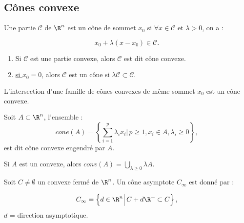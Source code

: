 \documentclass[12pt,a4paper]{article}
\begin{document}
	\subsection{Cônes convexe}
	
	\begin{defi}
		\begin{minipage}[t]{15cm}
			Une partie $\mathcal C$ de $\R^n$ est un cône de sommet $x_0$ si $\forall x \in \mathcal C$ et $\lambda > 0$, on a :
		\end{minipage}
		\[
			x_0 + \lambda(x-x_0) \in \mathcal C.
		\]
	\end{defi}
	
	\begin{rmq}
		\begin{minipage}[t]{15cm}
			\begin{enumerate}[label=$\textbullet$]
				\item  Si $\mathcal C$ est une partie convexe, alors $\mathcal C$ est dit cône convexe.
				
				\item \underline{si $x_0=0$}, alors $\mathcal C$ est un cône si $\lambda\mathcal C \subset \mathcal C$.
			\end{enumerate}
		\end{minipage}
	\end{rmq}
	
	\begin{prop}
		L'intersection d'une famille de cônes convexes de même sommet $x_0$ est un cône convexe.
	\end{prop}
	
	\begin{defi}
		Soit $A \subset \R^n$, l'ensemble :
		\[cone(A) = \left\{\displaystyle\sum_{i=1}^p \lambda_ix_i\Big|\, p \geq 1, x_i \in A, \lambda_i \geq 0\right\},\]
		est dit cône convexe engendré par $A$.
	\end{defi}
	
	\begin{rmq}
		Si $A$ est un convexe, alors $conv(A) = \bigcup_{\lambda\geq 0} \lambda A$.
	\end{rmq}
	
	\begin{defi}
		\begin{minipage}[t]{15cm}
			Soit $C \not= \emptyset$ un convexe fermé de $\R^n$. Un cône asymptote $C_\infty$ est donné par :
		\end{minipage}
		\[
			C_\infty = \left\{d\in \R^n \Big|\, C+d \R^+ \subset C\right\},
		\]
		$d$ = direction asymptotique.
	\end{defi}
	
\end{document}
